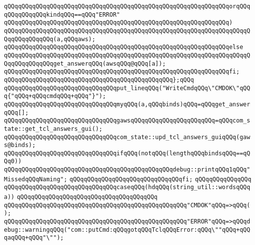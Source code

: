 \verb|qQQqqQQqqQQqqQQqqQQqqQQqqQQqqQQqqQQqqQQqqQQqqQQqqQQqqQQqqQQqqQQqorqQQqqQQqqQQqqQQqkindqQQq==qQQq"ERROR"|\newline
\verb|qQQqqQQqqQQqqQQqqQQqqQQqqQQqqQQqqQQqqQQqqQQqqQQqqQQqqQQqqQQqqQQq)|\newline
\verb|qQQqqQQqqQQqqQQqqQQqqQQqqQQqqQQqqQQqqQQqqQQqqQQqqQQqqQQqqQQqqQQqqQQqqQQqqQQqqQQqqQQq(a,qQQqaws);|\newline
\verb|qQQqqQQqqQQqqQQqqQQqqQQqqQQqqQQqqQQqqQQqqQQqqQQqqQQqqQQqqQQqqQQqelse|\newline
\verb|qQQqqQQqqQQqqQQqqQQqqQQqqQQqqQQqqQQqqQQqqQQqqQQqqQQqqQQqqQQqqQQqqQQqqQQqqQQqqQQqqQQqget_answerqQQq(awsqQQq@qQQq[a]);|\newline
\verb|qQQqqQQqqQQqqQQqqQQqqQQqqQQqqQQqqQQqqQQqqQQqqQQqqQQqqQQqqQQqqQQqfi;|\newline
\verb|qQQqqQQqqQQqqQQqqQQqqQQqqQQqqQQqqQQqqQQqqQQqqQQq};qQQq|\newline
\newline
\verb|qQQqqQQqqQQqqQQqqQQqqQQqqQQqqQQqput_lineqQQq("WriteCmdqQQq\"CMDOK\"qQQq{"qQQq+qQQqcmdqQQq+qQQq"}");|\newline
\verb|qQQqqQQqqQQqqQQqqQQqqQQqqQQqqQQqmyqQQq(a,qQQqbinds)qQQq=qQQqget_answerqQQq[];|\newline
\newline
\verb|qQQqqQQqqQQqqQQqqQQqqQQqqQQqqQQqgawsqQQqqQQqqQQqqQQqqQQqqQQq=qQQqcom_state::get_tcl_answers_gui();|\newline
\verb|qQQqqQQqqQQqqQQqqQQqqQQqqQQqqQQqcom_state::upd_tcl_answers_guiqQQq(gaws@binds);|\newline
\newline
\verb|qQQqqQQqqQQqqQQqqQQqqQQqqQQqqQQqifqQQq(notqQQq(lengthqQQqbindsqQQq==qQQq0))|\newline
\verb|qQQqqQQqqQQqqQQqqQQqqQQqqQQqqQQqqQQqqQQqqQQqqQQqdebug::printqQQq1qQQq"MissedqQQqNaming";|\newline
\verb|qQQqqQQqqQQqqQQqqQQqqQQqqQQqqQQqfi;|\newline
\verb|qQQqqQQqqQQqqQQq|\newline
\verb|qQQqqQQqqQQqqQQqqQQqqQQqqQQqqQQqcaseqQQq(hdqQQq(string_util::wordsqQQqa))|\newline
\verb|qQQqqQQqqQQqqQQqqQQqqQQqqQQqqQQqqQQqqQQq|\newline
\verb|qQQqqQQqqQQqqQQqqQQqqQQqqQQqqQQqqQQqqQQqqQQqqQQqqQQq"CMDOK"qQQq=>qQQq();|\newline
\verb|qQQqqQQqqQQqqQQqqQQqqQQqqQQqqQQqqQQqqQQqqQQqqQQqqQQq"ERROR"qQQq=>qQQqdebug::warningqQQq("com::putCmd:qQQqgotqQQqTclqQQqError:qQQq\""qQQq+qQQqaqQQq+qQQq"\"");|\newline
